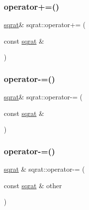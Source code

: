 \mbox{\label{classsqrat_ada81ae4a5701bba66394cf1a69786e70}} 
\subsubsection{\texorpdfstring{operator+=()}{operator+=()}\hspace{0.1cm}{\footnotesize\ttfamily [3/3]}}
{\footnotesize\ttfamily \mbox{\hyperlink{classsqrat}{sqrat}}\& sqrat\+::operator+= (\begin{DoxyParamCaption}\item[{const \mbox{\hyperlink{classsqrat}{sqrat}} \&}]{ }\end{DoxyParamCaption})}

\mbox{\label{classsqrat_a774a997c67358fea54d41cd8f29bdd3a}} 
\subsubsection{\texorpdfstring{operator-\/=()}{operator-=()}\hspace{0.1cm}{\footnotesize\ttfamily [1/3]}}
{\footnotesize\ttfamily \mbox{\hyperlink{classsqrat}{sqrat}}\& sqrat\+::operator-\/= (\begin{DoxyParamCaption}\item[{const \mbox{\hyperlink{classsqrat}{sqrat}} \&}]{ }\end{DoxyParamCaption})}

\mbox{\label{classsqrat_a1febaf3ebc9433b43d17f14e74f2057f}} 
\subsubsection{\texorpdfstring{operator-\/=()}{operator-=()}\hspace{0.1cm}{\footnotesize\ttfamily [2/3]}}
{\footnotesize\ttfamily \mbox{\hyperlink{classsqrat}{sqrat}} \& sqrat\+::operator-\/= (\begin{DoxyParamCaption}\item[{const \mbox{\hyperlink{classsqrat}{sqrat}} \&}]{other }\end{DoxyParamCaption})}

